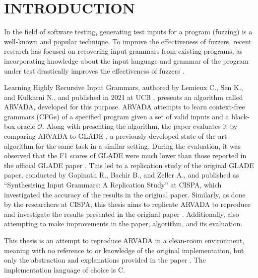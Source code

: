 \chapter{INTRODUCTION}

In the field of software testing, generating test inputs for a program (fuzzing) is a well-known and popular technique. To improve the effectiveness of fuzzers, recent research has focused on recovering input grammars from existing programs, as incorporating knowledge about the input language and grammar of the program under test drastically improves the effectiveness of fuzzers \cite{gopinathBuildingFastFuzzers2019}.

\vspace{\baselineskip}
Learning Highly Recursive Input Grammars, authored by Lemieux C., Sen K., and Kulkarni N., and published in 2021 at UCB \cite{kulkarniLearningHighlyRecursive2021}, presents an algorithm called ARVADA, developed for this purpose. ARVADA attempts to learn context-free grammars (CFGs) of a specified program given a set of valid inputs and a black-box oracle $\mathcal{O}$. Along with presenting the algorithm, the paper evaluates it by comparing ARVADA to GLADE \cite{bastaniSynthesizingProgramInput}, a previously developed state-of-the-art algorithm for the same task in a similar setting.
During the evaluation, it was observed that the F1 scores of GLADE were much lower than those reported in the official GLADE paper \cite{bastaniSynthesizingProgramInput}. This led to a replication study of the original GLADE paper, conducted by Gopinath R., Bachir B., and Zeller A., and published as “Synthesising Input Grammars: A Replication Study” \cite{bendrissouSynthesizingInputGrammars2022} at CISPA, which investigated the accuracy of the results in the original paper. Similarly, as done by the researchers at CISPA, this thesis aims to replicate ARVADA to reproduce and investigate the results presented in the original paper \cite{kulkarniLearningHighlyRecursive2021}. Additionally, also attempting to make improvements in the paper, algorithm, and its evaluation.

\vspace{\baselineskip}
This thesis is an attempt to reproduce ARVADA in a clean-room environment, meaning with no reference to or knowledge of the original implementation, but only the abstraction and explanations provided in the paper \cite{kulkarniLearningHighlyRecursive2021}. The implementation language of choice is C.

